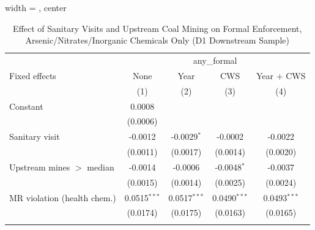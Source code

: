 
\begin{table}[htbp]
   
   \caption{\label{tab:sanitary_visit_upstream_mines_ols_healthchem} Effect of Sanitary Visits and Upstream Coal Mining on Formal Enforcement, Arsenic/Nitrates/Inorganic Chemicals Only (D1 Downstream Sample)}
   \bigskip
   
   \centering
   
   \begin{adjustbox}{width = \textwidth, center}
      
      
      \begin{tabular}{lcccc}
         \toprule
         
          & \multicolumn{4}{c}{any\_formal}\\
         
         Fixed effects               & None           & Year           & CWS            & Year + CWS \\   
         
                                     & (1)            & (2)            & (3)            & (4)\\  
         
         \midrule 
         Constant                    & 0.0008         &                &                &   \\   
                                     & (0.0006)       &                &                &   \\   
         Sanitary visit              & -0.0012        & -0.0029$^{*}$  & -0.0002        & -0.0022\\   
                                     & (0.0011)       & (0.0017)       & (0.0014)       & (0.0020)\\   
         Upstream mines $>$ median   & -0.0014        & -0.0006        & -0.0048$^{*}$  & -0.0037\\   
                                     & (0.0015)       & (0.0014)       & (0.0025)       & (0.0024)\\   
         MR violation (health chem.) & 0.0515$^{***}$ & 0.0517$^{***}$ & 0.0490$^{***}$ & 0.0493$^{***}$\\   
                                     & (0.0174)       & (0.0175)       & (0.0163)       & (0.0165)\\   
         
          \\
         

\end{tabular}
\end{adjustbox}
\end{table}
